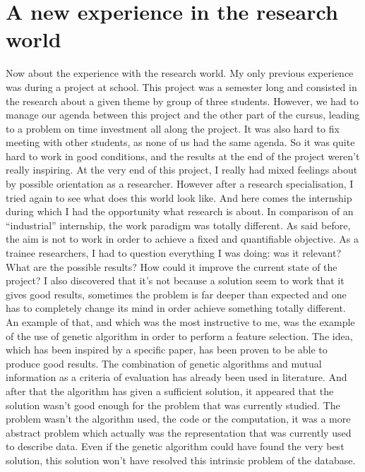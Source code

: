\documentclass{report}
\begin{document}
		\section{A new experience in the research world}
		
		Now about the experience with the research world. My only previous experience was during a project at school. This project was a semester long and consisted in the research about a given theme by group of three students. However, we had to manage our agenda between this project and the other part of the cursus, leading to a problem on time investment all along the project. It was also hard to fix meeting with other students, as none of us had the same agenda. So it was quite hard to work in good conditions, and the results at the end of the project weren't really inspiring. At the very end of this project, I really had mixed feelings about by possible orientation as a researcher. However after a research specialisation, I tried again to see what does this world look like. And here comes the internship during which I had the opportunity what research is about. In comparison of an “industrial” internship, the work paradigm was totally different. As said before, the aim is not to work in order to achieve a fixed and quantifiable objective. As a trainee researchers, I had to question everything I was doing: was it relevant? What are the possible results? How could it improve the current state of the project? I also discovered that it's not because a solution seem to work that it gives good results, sometimes the problem is far deeper than expected and one has to completely change its mind in order achieve something totally different.
		An example of that, and which was the most instructive to me, was the example of the use of genetic algorithm in order to perform a feature selection. The idea, which has been inspired by a specific paper, has been proven to be able to produce good results. The combination of genetic algorithms and mutual information as a criteria of evaluation has already been used in literature. And after that the algorithm has given a sufficient solution, it appeared that the solution wasn't good enough for the problem that was currently studied. The problem wasn't the algorithm used, the code or the computation, it was a more abstract problem which actually was the representation that was currently used to describe data. Even if the genetic algorithm could have found the very best solution, this solution won't have resolved this intrinsic problem of the database.\\
		
\end{document}
